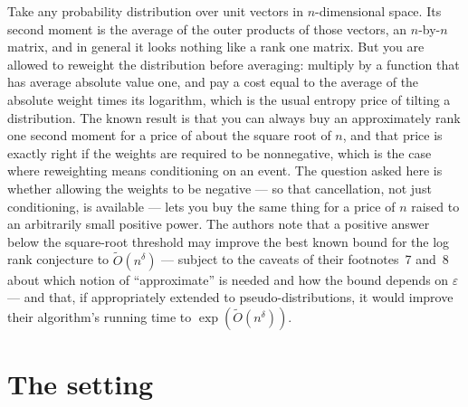 \documentclass{conjura-conjecture}
\newcommand{\Ot}{\tilde{O}}
\begin{document}

\vspace{0.4em}

\begin{informalconjecture}
Take any probability distribution over unit vectors in
$n$-dimensional space. Its second moment is the average of the outer
products of those vectors, an $n$-by-$n$ matrix, and in general it
looks nothing like a rank one matrix. But you are allowed to reweight
the distribution before averaging: multiply by a function that has
average absolute value one, and pay a cost equal to the average of the
absolute weight times its logarithm, which is the usual entropy price
of tilting a distribution. The known result is that you can always buy
an approximately rank one second moment for a price of about the
square root of $n$, and that price is exactly right if the weights are
required to be nonnegative, which is the case where reweighting means
conditioning on an event. The question asked here is whether allowing
the weights to be negative --- so that cancellation, not just
conditioning, is available --- lets you buy the same thing for a price
of $n$ raised to an arbitrarily small positive power. The authors note
that a positive answer below the square-root threshold may improve the
best known bound for the log rank conjecture to $\Ot(n^{\delta})$ ---
subject to the caveats of their footnotes~7 and~8 about which notion
of ``approximate'' is needed and how the bound depends on $\varepsilon$
--- and that, if appropriately extended to pseudo-distributions, it
would improve their algorithm's running time to
$\exp(\Ot(n^{\delta}))$.
\end{informalconjecture}

\section{The setting}\label{sec:setting}
\end{document}
